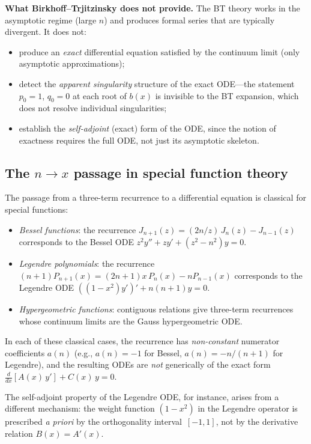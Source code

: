 \documentclass[11pt,a4paper]{amsart}
\theoremstyle{plain}
\theoremstyle{definition}
\theoremstyle{remark}
\begin{document}
\textbf{What Birkhoff--Trjitzinsky does not provide.}
The BT theory works in the asymptotic regime (large $n$) and
produces formal series that are typically divergent.  It does not:
\begin{itemize}
\item produce an \emph{exact} differential equation satisfied by
  the continuum limit (only asymptotic approximations);
\item detect the \emph{apparent singularity} structure of the
  exact ODE---the statement $p_0 = 1$, $q_0 = 0$ at each root
  of $b(x)$ is invisible to the BT expansion, which does not
  resolve individual singularities;
\item establish the \emph{self-adjoint} (exact) form of the ODE,
  since the notion of exactness requires the full ODE, not just
  its asymptotic skeleton.
\end{itemize}

\subsection{The \texorpdfstring{$n \to x$}{n to x} passage
  in special function theory}

The passage from a three-term recurrence to a differential equation
is classical for special functions:
\begin{itemize}
\item \emph{Bessel functions}: the recurrence
  $J_{n+1}(z) = (2n/z)\,J_n(z) - J_{n-1}(z)$ corresponds to the
  Bessel ODE $z^2 y'' + zy' + (z^2-n^2)y = 0$.
\item \emph{Legendre polynomials}: the recurrence
  $(n+1)P_{n+1}(x) = (2n+1)x\,P_n(x) - nP_{n-1}(x)$ corresponds
  to the Legendre ODE $((1-x^2)y')' + n(n+1)y = 0$.
\item \emph{Hypergeometric functions}: contiguous relations give
  three-term recurrences whose continuum limits are the Gauss
  hypergeometric ODE.
\end{itemize}
In each of these classical cases, the recurrence has
\emph{non-constant} numerator coefficients $a(n)$ (e.g., $a(n)=-1$
for Bessel, $a(n) = -n/(n+1)$ for Legendre), and the resulting
ODEs are \emph{not} generically of the exact form
$\tfrac{d}{dx}[A(x)\,y'] + C(x)\,y = 0$.

The self-adjoint property of the Legendre ODE, for instance,
arises from a different mechanism: the weight function
$(1-x^2)$ in the Legendre operator is prescribed \emph{a priori}
by the orthogonality interval~$[-1,1]$, not by the derivative
relation $B(x) = A'(x)$.
\end{document}
